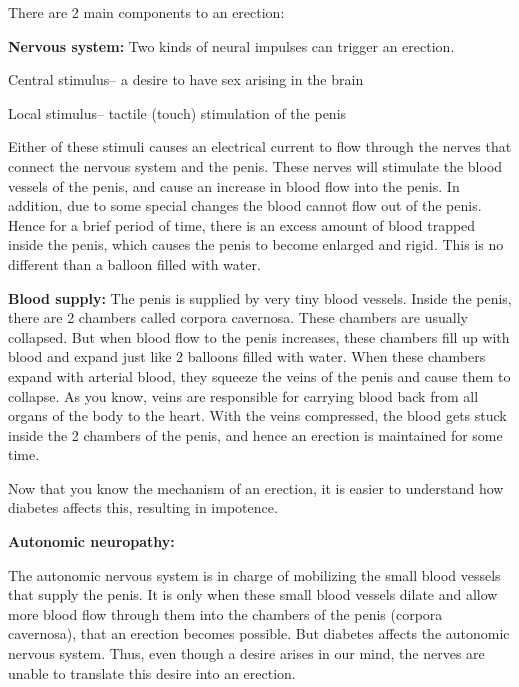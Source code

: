 {There are 2 main components to an erection:

\item \textbf{Nervous system:} Two kinds of neural impulses can trigger an erection.
 \item Central stimulus– a desire to have sex arising in the brain

 \item 
 Local stimulus– tactile (touch) stimulation of the penis

 Either of these stimuli causes an electrical current to flow through the nerves that connect the nervous system and the penis. These nerves will stimulate the blood vessels of the penis, and cause an increase in blood flow into the penis. In addition, due to some special changes the blood cannot flow out of the penis. Hence for a brief period of time, there is an excess amount of blood trapped inside the penis, which causes the penis to become enlarged and rigid. This is no different than a balloon filled with water.



 \item 
 \textbf{Blood supply:} The penis is supplied by very tiny blood vessels. Inside the penis, there are 2 chambers called corpora cavernosa. These chambers are usually collapsed. But when blood flow to the penis increases, these chambers fill up with blood and expand just like 2 balloons filled with water. When these chambers expand with arterial blood, they squeeze the veins of the penis and cause them to collapse. As you know, veins are responsible for carrying blood back from all organs of the body to the heart. With the veins compressed, the blood gets stuck inside the 2 chambers of the penis, and hence an erection is maintained for some time.

 Now that you know the mechanism of an erection, it is easier to understand how diabetes affects this, resulting in impotence.

 \item 
 \textbf{Autonomic neuropathy:}

 The autonomic nervous system is in charge of mobilizing the small blood vessels that supply the penis. It is only when these small blood vessels dilate and allow more blood flow through them into the chambers of the penis (corpora cavernosa), that an erection becomes possible. But diabetes affects the autonomic nervous system. Thus, even though a desire arises in our mind, the nerves are unable to translate this desire into an erection.

}
